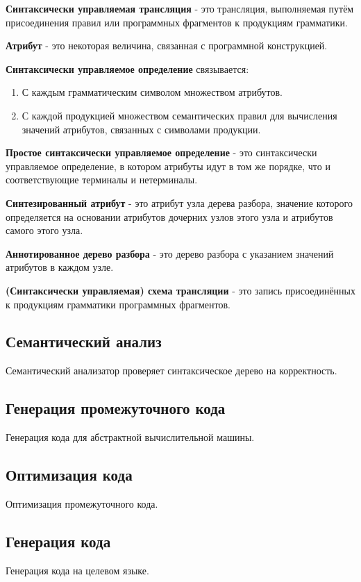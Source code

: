 \documentclass[oneside]{book}
\begin{document}
    \textbf{Синтаксически управляемая трансляция} - это трансляция,
    выполняемая путём присоединения правил или программных фрагментов
    к продукциям грамматики.

    \textbf{Атрибут} - это некоторая величина, связанная с программной конструкцией.

    \textbf{Синтаксически управляемое определение} связывается:
    \begin{enumerate}
        \item С каждым грамматическим символом множеством атрибутов.
        \item С каждой продукцией множеством семантических правил для
            вычисления значений атрибутов, связанных с символами продукции.
    \end{enumerate}

    \textbf{Простое синтаксически управляемое определение} - это
    синтаксически управляемое определение, в котором атрибуты идут
    в том же порядке, что и соответствующие терминалы и нетерминалы.

    \textbf{Синтезированный атрибут} - это атрибут узла дерева разбора,
    значение которого определяется на основании атрибутов дочерних узлов
    этого узла и атрибутов самого этого узла.

    \textbf{Аннотированное дерево разбора} - это дерево разбора с указанием значений
    атрибутов в каждом узле.

    \textbf{(Синтаксически управляемая) схема трансляции} - это запись присоединённых
    к продукциям грамматики программных фрагментов.

    \subsection{Семантический анализ}
    Семантический анализатор проверяет синтаксическое дерево на корректность.

    \subsection{Генерация промежуточного кода}
    Генерация кода для абстрактной вычислительной машины.

    \subsection{Оптимизация кода}
    Оптимизация промежуточного кода.

    \subsection{Генерация кода}
    Генерация кода на целевом языке.
\end{document}
